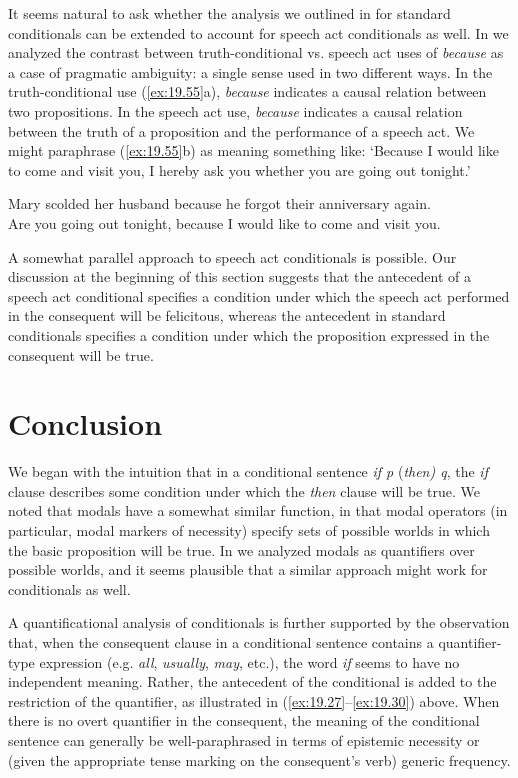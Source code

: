 It seems natural to ask whether the analysis we outlined in  for standard conditionals can be extended to account for speech act conditionals as well. In  we analyzed the contrast between truth-conditional vs. speech act uses of \textit{because} as a case of pragmatic ambiguity: a single sense used in two different ways. In the truth-conditional use (\ref{ex:19.55}a), \textit{because} indicates a causal relation between two propositions. In the speech act use, \textit{because} indicates a causal relation between the truth of a proposition and the performance of a speech act. We might paraphrase (\ref{ex:19.55}b) as meaning something like: ‘Because I would like to come and visit you, I hereby ask you whether you are going out tonight.’


\ea \label{ex:19.55}
\ea  Mary scolded her husband because he forgot their anniversary again.\\
\ex Are you going out tonight, because I would like to come and visit you.
                       \z
\z


A somewhat parallel approach to speech act conditionals is possible. Our discussion at the beginning of this section suggests that the antecedent of a speech act conditional specifies a condition under which the speech act performed in the consequent will be felicitous, whereas the antecedent in standard conditionals specifies a condition under which the proposition expressed in the consequent will be true.


\section{Conclusion}\label{sec:19.8}

We began with the intuition that in a conditional sentence \textit{if p} (\textit{then) q}, the \textit{if} clause describes some condition under which the \textit{then} clause will be true. We noted that modals have a somewhat similar function, in that modal operators (in particular, modal markers of necessity) specify sets of possible worlds in which the basic proposition will be true. In  we analyzed modals as quantifiers over possible worlds, and it seems plausible that a similar approach might work for conditionals as well.



A quantificational analysis of conditionals is further supported by the observation that, when the consequent clause in a conditional sentence contains a quantifier-type expression (e.g. \textit{all}, \textit{usually}, \textit{may}, etc.), the word \textit{if} seems to have no independent meaning. Rather, the antecedent of the conditional is added to the restriction of the quantifier, as illustrated in (\ref{ex:19.27}--\ref{ex:19.30}) above. When there is no overt quantifier in the consequent, the meaning of the conditional sentence can generally be well-paraphrased in terms of epistemic necessity or (given the appropriate tense marking on the consequent’s verb) generic frequency.




